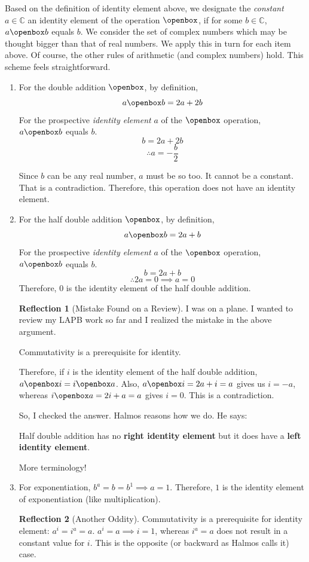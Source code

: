 \documentclass[english,notitlepage,smartquotes]{hgbreport}
\theoremstyle{definition}
\theoremstyle{definition}
\theoremstyle{remark}
\theoremstyle{definition}
\theoremstyle{plain}
\theoremstyle{definition}
\newtheorem{reflection}{Reflection}
\begin{document}
Based on the definition of identity element above, we designate the \emph{constant} $a\in\mathbb{C}$ an identity element of the operation $\openbox$, if for some $b\in\mathbb{C}$, $a\openbox b$ equals $b$. We consider the set of complex numbers which may be thought bigger than that of real numbers. We apply this in turn for each item above. Of course, the other rules of arithmetic (and complex numbers) hold. This scheme feels straightforward.
\begin{enumerate}
\item For the double addition $\openbox$, by definition,
$$
a\openbox b=2a+2b
$$
For the prospective \emph{identity element} $a$ of the $\openbox$ operation, $a\openbox b$ equals $b$.
$$
b=2a+2b
$$
$$
\therefore a=-\frac{b}{2}
$$

Since $b$ can be any real number, $a$ must be so too. It cannot be a constant. That is a contradiction. Therefore, this operation does not have an identity element.
\item For the half double addition $\openbox$, by definition,
$$
a\openbox b=2a+b
$$
For the prospective \emph{identity element} $a$ of the $\openbox$ operation, $a\openbox b$ equals $b$.
$$
b=2a+b
$$
$$
\therefore 2a=0\implies a=0
$$
Therefore, $0$ is the identity element of the half double addition. 
\begin{reflection}[Mistake Found on a Review]
I was on a plane. I wanted to review my LAPB work so far and I realized the mistake in the above argument.

Commutativity is a prerequisite for identity.

Therefore, if $i$ is the identity element of the half double addition, $a\openbox i=i\openbox a$. Also, $a\openbox i=2a+i=a$ gives us $i=-a$, whereas $i\openbox a=2i+a=a$ gives $i=0$. This is a contradiction.

So, I checked the answer. Halmos reasons how we do. He says:
\begin{sidebar}
Half double addition has no \textbf{right identity element} but it does have a \textbf{left identity element}.
\end{sidebar}
More terminology!
\end{reflection}

\item For exponentiation, $b^a=b=b^1\implies a=1$. Therefore, $1$ is the identity element of exponentiation (like multiplication).

\begin{reflection}[Another Oddity]
Commutativity is a prerequisite for identity element: $a^i=i^a=a$. $a^i=a\implies i=1$, whereas $i^a=a$ does not result in a constant value for $i$. This is the opposite (or backward as Halmos calls it) case. 
\end{reflection}


\end{enumerate}
\end{document}

